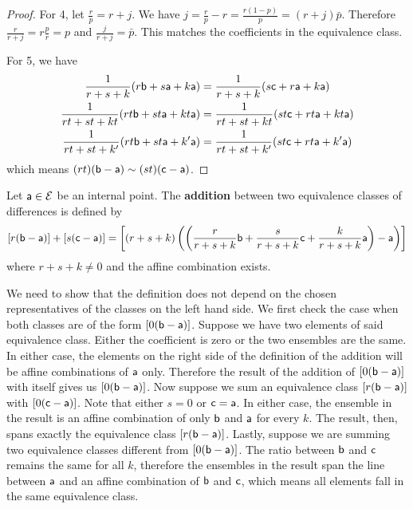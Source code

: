 \begin{mathSection}
\begin{proof}
		For 4, let $\frac{r}{p}=r+j$. We have $j = \frac{r}{p}-r = \frac{r(1-p)}{p} = (r+j)\bar{p}$. Therefore $\frac{r}{r+j} = r\frac{p}{r} = p$ and $\frac{j}{r+j} = \bar{p}$. This matches the coefficients in the equivalence class.
		
		For 5, we have
		\begin{equation}
			\begin{aligned}
				\frac{1}{r+s+k} (r \ens[b] + s \ens[a] + k \ens[a]) &= \frac{1}{r+s+k} (s \ens[c] + r \ens[a] + k \ens[a]) \\
				\frac{1}{rt+st+kt} (rt \ens[b] + st \ens[a] + kt \ens[a]) &= \frac{1}{rt+st+kt} (st \ens[c] + rt \ens[a] + kt \ens[a]) \\
				\frac{1}{rt+st+k'} (rt \ens[b] + st \ens[a] + k' \ens[a]) &= \frac{1}{rt+st+k'} (st \ens[c] + rt \ens[a] + k' \ens[a])
			\end{aligned}
		\end{equation}
		which means $(rt)(\ens[b] - \ens[a]) \sim (st)(\ens[c] - \ens[a])$.
	\end{proof}
	
	\begin{defn}
		Let $\ens[a] \in \Ens$ be an internal point. The \textbf{addition} between two equivalence classes of differences is defined by 
		$$\left[r(\ens[b] - \ens[a])\right] + \left[s(\ens[c] - \ens[a])\right] = \left[(r+s+k) \left(\left(\frac{r}{r+s+k}\ens[b] + \frac{s}{r+s+k} \ens[c] +\frac{k}{r+s+k} \ens[a] \right) - \ens[a]\right)\right]$$
		where $r+s+k \neq 0$ and the affine combination exists.
	\end{defn}
	\begin{check}
		We need to show that the definition does not depend on the chosen representatives of the classes on the left hand side. We first check the case when both classes are of the form $[0(\ens[b] - \ens[a])]$. Suppose we have two elements of said equivalence class. Either the coefficient is zero or the two ensembles are the same. In either case, the elements on the right side of the definition of the addition will be affine combinations of $\ens[a]$ only. Therefore the result of the addition of $[0(\ens[b] - \ens[a])]$ with itself gives us $[0(\ens[b] - \ens[a])]$. Now suppose we sum an equivalence class $[r(\ens[b] - \ens[a])]$ with $[0(\ens[c] - \ens[a])]$. Note that either $s=0$ or $\ens[c]=\ens[a]$. In either case, the ensemble in the result is an affine combination of only $\ens[b]$ and $\ens[a]$ for every $k$. The result, then, spans exactly the equivalence class $[r(\ens[b] - \ens[a])]$. Lastly, suppose we are summing two equivalence classes different from $[0(\ens[b] - \ens[a])]$. The ratio between $\ens[b]$ and $\ens[c]$ remains the same for all $k$, therefore the ensembles in the result span the line between $\ens[a]$ and an affine combination of $\ens[b]$ and $\ens[c]$, which means all elements fall in the same equivalence class.
	\end{check}
	

\end{mathSection}
